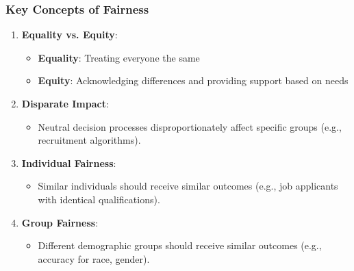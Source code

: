 \documentclass[aspectratio=169]{beamer}
\begin{document}
\begin{frame}[fragile]
    \frametitle{Key Concepts of Fairness}
    \begin{enumerate}
        \item \textbf{Equality vs. Equity}:
            \begin{itemize}
                \item \textbf{Equality}: Treating everyone the same
                \item \textbf{Equity}: Acknowledging differences and providing support based on needs
            \end{itemize}
        
        \item \textbf{Disparate Impact}:
            \begin{itemize}
                \item Neutral decision processes disproportionately affect specific groups (e.g., recruitment algorithms).
            \end{itemize}
        
        \item \textbf{Individual Fairness}:
            \begin{itemize}
                \item Similar individuals should receive similar outcomes (e.g., job applicants with identical qualifications).
            \end{itemize}
        
        \item \textbf{Group Fairness}:
            \begin{itemize}
                \item Different demographic groups should receive similar outcomes (e.g., accuracy for race, gender).
            \end{itemize}
    \end{enumerate}
\end{frame}
\end{document}
